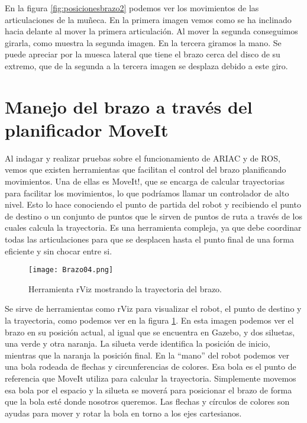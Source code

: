 En la figura \ref{fig:posicionesbrazo2} podemos ver los movimientos de las articulaciones de la muñeca. En la primera imagen vemos como se ha inclinado hacia delante al mover la primera articulación. Al mover la segunda conseguimos girarla, como muestra la segunda imagen. En la tercera giramos la mano. Se puede apreciar por la muesca lateral que tiene el brazo cerca del disco de su extremo, que de la segunda a la tercera imagen se desplaza debido a este giro.

\section{Manejo del brazo a través del planificador MoveIt}
\label{sec:br_moveit}

Al indagar y realizar pruebas sobre el funcionamiento de ARIAC y de ROS, vemos que existen herramientas que facilitan el control del brazo planificando movimientos. Una de ellas es MoveIt!, que se encarga de calcular trayectorias para facilitar los movimientos, lo que podríamos llamar un controlador de alto nivel. Esto lo hace conociendo el punto de partida del robot y recibiendo el punto de destino o un conjunto de puntos que le sirven de puntos de ruta a través de los cuales calcula la trayectoria. Es una herramienta compleja, ya que debe coordinar todas las articulaciones para que se desplacen hasta el punto final de una forma eficiente y sin chocar entre si. 

\begin{figure}[h]
	\centering
	\texttt{[image: Brazo04.png]}
	\caption{Herramienta rViz mostrando la trayectoria del brazo.} \label{fig:rviz}
\end{figure}

Se sirve de herramientas como rViz para visualizar el robot, el punto de destino y la trayectoria, como podemos ver en la figura \ref{fig:rviz}. En esta imagen podemos ver el brazo en su posición actual, al igual que se encuentra en Gazebo, y dos siluetas, una verde y otra naranja. La silueta verde identifica la posición de inicio, mientras que la naranja la posición final. En la “mano” del robot podemos ver una bola rodeada de flechas y circunferencias de colores. Esa bola es el punto de referencia que MoveIt utiliza para calcular la trayectoria. Simplemente movemos esa bola por el espacio y la silueta se moverá para posicionar el brazo de forma que la bola esté donde nosotros queremos. Las flechas y círculos de colores son ayudas para mover y rotar la bola en torno a los ejes cartesianos. 

